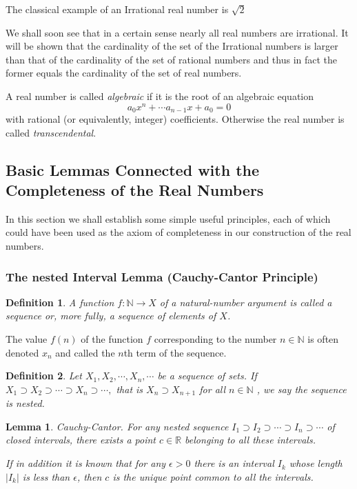 \documentclass[a4paper,12pt]{article} %
\newtheorem{definition}{Definition}[section]
\newtheorem{lemma}[theorem]{Lemma}
\begin{document}
The classical example of an Irrational real number is $\sqrt{2}$

We shall soon see that in a certain sense nearly all real numbers 
are irrational. It will be shown that the cardinality of the set 
of the Irrational numbers is larger than that of the cardinality 
of the set of rational numbers and thus in fact the former equals
the cardinality of the set of real numbers.

A real number is called \textit{algebraic} if it is the root of an algebraic 
equation \[a_0 x^n+\cdots a_{n-1}x+a_0=0\]
with rational (or equivalently, integer) coefficients. Otherwise the 
real number is called \textit{transcendental}.

\subsection{Basic Lemmas Connected with the Completeness of the Real Numbers}
In this section we shall establish some simple useful principles, each of 
which could have been used as the axiom of completeness in our construction
of the real numbers.

\subsubsection{The nested Interval Lemma (Cauchy-Cantor Principle)}
\begin{definition}
    A function $f:\mathbb{N}\to X$ of a natural-number argument is called
    a sequence or, more fully, a sequence of elements of $X$.
\end{definition}

The value $f(n)$ of the function $f$ corresponding to the number 
$n\in\mathbb{N}$ is often denoted $x_n$ and called the $n$th term of 
the sequence.

\begin{definition}
    Let $X_1,X_2,\cdots,X_n,\cdots$ be a sequence of sets. If $X_1\supset X_2\supset 
    \cdots\supset X_n \supset \cdots,$ that is $X_n \supset X_{n+1}$ for all $n\in \mathbb{N}$
    , we say the sequence is nested.
\end{definition}

\begin{lemma}{Cauchy-Cantor.}
    For any nested sequence $I_1 \supset I_2 \supset \cdots \supset I_n  \supset \cdots$
    of closed intervals, there exists a point $c\in \mathbb{R}$
    belonging to all these intervals.

    If in addition it is known that for any $\epsilon >0  $
    there is an interval $I_k$ whose length $|I_k|$
    is less than $\epsilon$, then $c$ is the unique point common to all
    the intervals.
\end{lemma}
\end{document}
